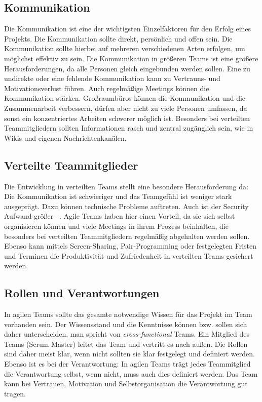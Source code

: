 \subsection{Kommunikation}
Die Kommunikation ist eine der wichtigsten Einzelfaktoren für den Erfolg eines Projekts. Die Kommunikation sollte direkt, persönlich und offen sein. Die Kommunikation sollte hierbei auf mehreren verschiedenen Arten erfolgen, um möglichst effektiv zu sein. Die Kommunikation in größeren Teams ist eine größere Herausforderungen, da alle Personen gleich eingebunden werden sollen. Eine zu undirekte oder eine fehlende Kommunikation kann zu Vertrauns- und Motivationsverlust führen. Auch regelmäßige Meetings können die Kommunikation stärken. Großraumbüros können die Kommunikation und die Zusammenarbeit verbessern, dürfen aber nicht zu viele Personen umfassen, da sonst ein konzentriertes Arbeiten schwerer möglich ist. Besonders bei verteilten Teammitgliedern sollten Informationen rasch und zentral zugänglich sein, wie in Wikis und eigenen Nachrichtenkanälen. 
\subsection{Verteilte Teammitglieder}
Die Entwicklung in verteilten Teams stellt eine besondere Herausforderung da: Die Kommunikation ist schwieriger und das Teamgefühl ist weniger stark ausgeprägt. Dazu können technische Probleme auftreten. Auch ist der Security Aufwand größer ~\parencite{sutherland2007distributed}. Agile Teams haben hier einen Vorteil, da sie sich selbst organisieren können und viele Meetings in ihrem Prozess beinhalten, die besonders bei verteilten Teammitgliedern regelmäßig abgehalten werden sollen. Ebenso kann mittels Screen-Sharing, Pair-Programming oder festgelegten Fristen und Terminen die Produktivität und Zufriedenheit in verteilten Teams gesichert werden. 
\subsection{Rollen und Verantwortungen}
In agilen Teams sollte das gesamte notwendige Wissen für das Projekt im Team vorhanden sein. Der Wissensstand und die Kenntnisse können bzw. sollen sich daher unterscheiden, man spricht von \textit{cross-functional} Teams.  Ein Mitglied des Teams (Scrum Master) leitet das Team und vertritt es nach außen. Die Rollen sind daher meist klar, wenn nicht sollten sie klar festgelegt und definiert werden. Ebenso ist es bei der Verantwortung: In agilen Teams trägt jedes Teammitglied die Verantwortung selbst, wenn nicht, muss auch dies definiert werden. Das Team kann bei Vertrauen, Motivation und Selbstorganisation die Verantwortung gut tragen.
